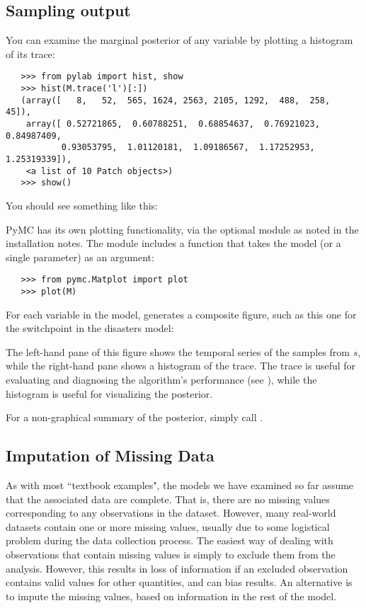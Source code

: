 \subsection{Sampling output}
You can examine the marginal posterior of any variable by plotting a histogram of its trace:
\begin{verbatim}
   >>> from pylab import hist, show
   >>> hist(M.trace('l')[:])
   (array([   8,   52,  565, 1624, 2563, 2105, 1292,  488,  258,   45]),
    array([ 0.52721865,  0.60788251,  0.68854637,  0.76921023,  0.84987409,
           0.93053795,  1.01120181,  1.09186567,  1.17252953,  1.25319339]),
    <a list of 10 Patch objects>)
   >>> show()
\end{verbatim}
You should see something like this:
\begin{center}
\end{center}
PyMC has its own plotting functionality, via the optional
 module as noted in the installation notes. The
 module includes a  function that takes the
model (or a single parameter) as an argument:
\begin{verbatim}
   >>> from pymc.Matplot import plot
   >>> plot(M)
\end{verbatim}
For each variable in the model,  generates a composite figure, such as this one for the switchpoint in the disasters model:
\begin{center}
\end{center}
The left-hand pane of this figure shows the temporal series of the samples from $s$, while the right-hand pane shows a histogram of the trace. The trace is useful for evaluating and diagnosing the algorithm's performance (see \cite*{gelman}), while the histogram is useful for visualizing the posterior.

For a non-graphical summary of the posterior, simply call .

\hypertarget{missing}{}
\subsection{Imputation of Missing Data} %

As with most ``textbook examples", the models we have examined so far assume that the associated data are complete. That is, there are no missing values corresponding to any observations in the dataset. However, many real-world datasets contain one or more missing values, usually due to some logistical problem during the data collection process. The easiest way of dealing with observations that contain missing values is simply to exclude them from the analysis. However, this results in loss of information if an excluded observation contains valid values for other quantities, and can bias results. An alternative is to impute the missing values, based on information in the rest of the model.

